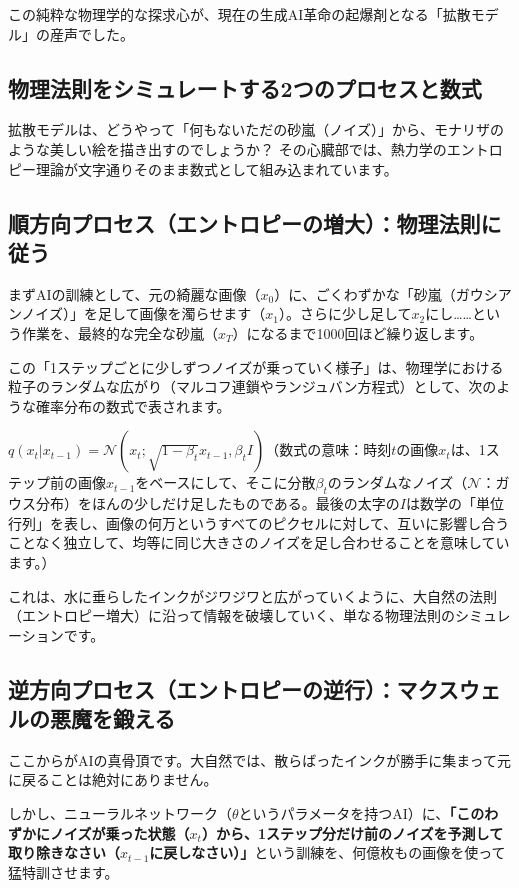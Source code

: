 この純粋な物理学的な探求心が、現在の生成AI革命の起爆剤となる「拡散モデル」の産声でした。

\subsection{物理法則をシミュレートする2つのプロセスと数式}

拡散モデルは、どうやって「何もないただの砂嵐（ノイズ）」から、モナリザのような美しい絵を描き出すのでしょうか？ その心臓部では、熱力学のエントロピー理論が文字通りそのまま数式として組み込まれています。

\subsection{順方向プロセス（エントロピーの増大）：物理法則に従う}

まずAIの訓練として、元の綺麗な画像（\(x_0\)）に、ごくわずかな「砂嵐（ガウシアンノイズ）」を足して画像を濁らせます（\(x_1\)）。さらに少し足して\(x_2\)にし\ldots{}\ldots{}という作業を、最終的な完全な砂嵐（\(x_T\)）になるまで1000回ほど繰り返します。

この「1ステップごとに少しずつノイズが乗っていく様子」は、物理学における粒子のランダムな広がり（マルコフ連鎖やランジュバン方程式）として、次のような確率分布の数式で表されます。

\(q(x_t|x_{t-1})=\mathcal{N}(x_t;\sqrt{1-\beta_t}x_{t-1},\beta_t I)\)（数式の意味：時刻\(t\)の画像\(x_t\)は、1ステップ前の画像\(x_{t-1}\)をベースにして、そこに分散\(\beta_t\)のランダムなノイズ（\(\mathcal{N}\)：ガウス分布）をほんの少しだけ足したものである。最後の太字の\(I\)は数学の「単位行列」を表し、画像の何万というすべてのピクセルに対して、互いに影響し合うことなく独立して、均等に同じ大きさのノイズを足し合わせることを意味しています。）

これは、水に垂らしたインクがジワジワと広がっていくように、大自然の法則（エントロピー増大）に沿って情報を破壊していく、単なる物理法則のシミュレーションです。

\subsection{逆方向プロセス（エントロピーの逆行）：マクスウェルの悪魔を鍛える}

ここからがAIの真骨頂です。大自然では、散らばったインクが勝手に集まって元に戻ることは絶対にありません。

しかし、ニューラルネットワーク（\(\theta\)というパラメータを持つAI）に、\textbf{「このわずかにノイズが乗った状態（\(x_t\)）から、1ステップ分だけ前のノイズを予測して取り除きなさい（\(x_{t-1}\)に戻しなさい）」}という訓練を、何億枚もの画像を使って猛特訓させます。

